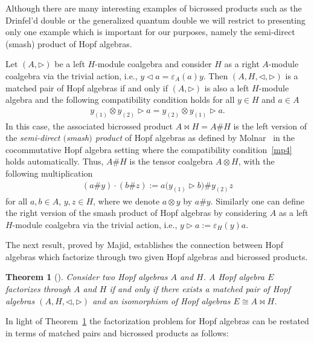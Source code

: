 \documentclass[11pt]{article}
\numberwithin{equation}{section}
\newtheorem{Theorem}{Theorem}[section]
\begin{document}
Although there are many interesting examples of bicrossed products such as the Drinfel'd double \cite[Theorem~IX.3.5]{Kassel} or the generalized quantum double \cite[Example~7.2.6]{majid} we will restrict to presenting only one example which is important for our purposes, namely the semi-direct (smash) product of Hopf algebras.

\begin{Example} \label{exempleban}
Let $(A, \triangleright)$ be a left $H$-module coalgebra and consider $H$ as a right $A$-module coalgebra via the trivial action, i.e., $y \triangleleft a = \varepsilon_A(a) y$. Then $(A,H, \triangleleft, \triangleright)$ is a matched pair of Hopf algebras if and only if $(A, \triangleright)$ is also a left $H$-module algebra and the following compatibility condition holds for all $y \in H$ and $a\in A$
\begin{gather*}
y_{(1)} \otimes y_{(2)} \triangleright a = y_{(2)} \otimes y_{(1)} \triangleright a.
\end{gather*}
In this case, the associated bicrossed product $A\bowtie H = A\# H$ is the left version of the \emph{semi-direct $($smash$)$ product} of Hopf algebras as defined by Molnar~\cite{Mo} in the cocommutative Hopf algebra setting where the compatibility condition~\eqref{mp4} holds automatically. Thus, $A\# H$ is the tensor coalgebra $A\otimes H$, with the following multiplication
\begin{gather*}
(a \# y) \cdot (b \# z):= a \big(y_{(1)} \triangleright b \big) \# y_{(2)} z
\end{gather*}
for all $a, b\in A$, $y, z\in H$, where we denote $a\otimes y$ by $a\# y$. Similarly one can define the right version of the smash product of Hopf algebras by considering $A$ as a left $H$-module coalgebra via the trivial action, i.e., $y \triangleright a := \varepsilon_H(y) a$.
\end{Example}

The next result, proved by Majid, establishes the connection between Hopf algebras which factorize through two given Hopf algebras and bicrossed products.

\begin{Theorem}[{\cite[Theorem 7.2.3]{majid2}}]\label{carMaj}
Consider two Hopf algebras $A$ and $H$. A Hopf algebra $E$ factorizes through $A$ and $H$ if and only if there exists a matched pair of Hopf algebras $(A, H, \triangleleft, \triangleright)$ and an isomorphism of Hopf algebras $E \cong A \bowtie H$.
\end{Theorem}
In light of Theorem~\ref{carMaj} the factorization problem for Hopf
algebras can be restated in terms of matched pairs and bicrossed products as follows:
\end{document}
